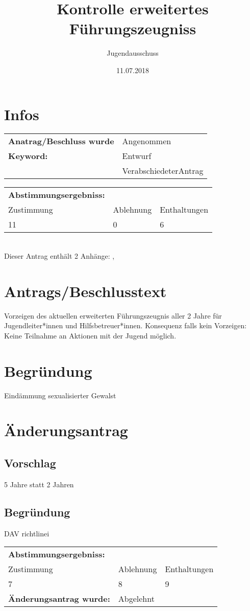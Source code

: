 \documentclass[12pt,a4paper]{scrartcl}
\begin{document}
\title{Kontrolle erweitertes Führungszeugniss}
\author{Jugendausschuss}
\date{11.07.2018}
\maketitle
\section{Infos}
\begin{tabularx}{\linewidth}{@{}lX}
\textbf{Anatrag/Beschluss wurde} & Angenommen\\
\textbf{Keyword:} & Entwurf\\
 & VerabschiedeterAntrag\\
\end{tabularx}
\begin{tabularx}{\linewidth}{@{}XXX}
\textbf{Abstimmungsergebniss:}&&\\
Zustimmung & Ablehnung & Enthaltungen \\
11 & 0 & 6 \\
\end{tabularx}\\ 
 Dieser Antrag enthält 2 Anhänge: ,  
\section{Antrags/Beschlusstext}
Vorzeigen des aktuellen erweiterten Führungszeugnis aller 2 Jahre für Jugendleiter*innen und Hilfsbetreuer*innen. Konsequenz falls kein Vorzeigen: Keine Teilnahme an Aktionen mit der Jugend möglich.
\section{Begründung}
Eindämmung sexualisierter Gewalst
\section{Änderungsantrag}
\subsection*{Vorschlag}
5 Jahre statt 2 Jahren
\subsection*{Begründung}
DAV richtlinei\vspace{1.5ex} \\
\begin{tabularx}{\linewidth}{@{}XXX}
\textbf{Abstimmungsergebniss:}&&\\
Zustimmung & Ablehnung & Enthaltungen \\
7 & 8 & 9 \\
\multicolumn{@{}2}{l}{\textbf{Änderungsantrag wurde:}} & Abgelehnt \\
\end{tabularx}
\appendix
\end{document}
